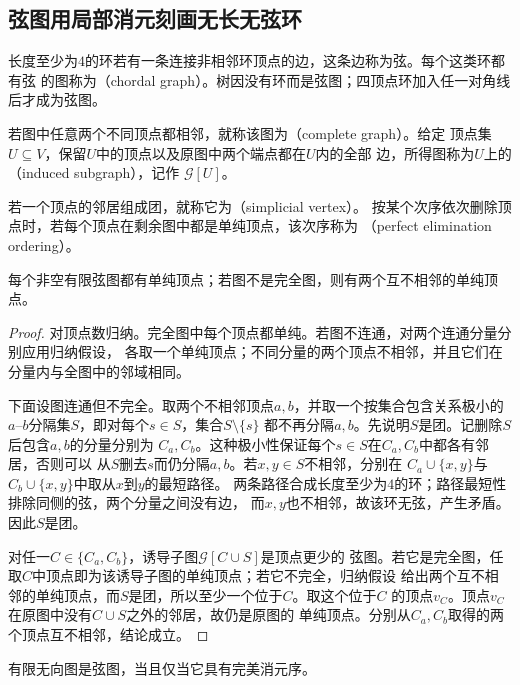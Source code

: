 \subsection{弦图用局部消元刻画无长无弦环}

长度至少为\(4\)的环若有一条连接非相邻环顶点的边，这条边称为弦。每个这类环都有弦
的图称为（chordal graph）。树因没有环而是弦图；四顶点环加入任一对角线
后才成为弦图。

若图中任意两个不同顶点都相邻，就称该图为（complete graph）。给定
顶点集\(U\subseteq V\)，保留\(U\)中的顶点以及原图中两个端点都在\(U\)内的全部
边，所得图称为\(U\)上的（induced subgraph），记作
\(\mathcal{G}[U]\)。

若一个顶点的邻居组成团，就称它为（simplicial vertex）。
按某个次序依次删除顶点时，若每个顶点在剩余图中都是单纯顶点，该次序称为
（perfect elimination ordering）。

\begin{lemma}[弦图的单纯顶点]
  \label{lem:graph-theory-chordal-simplicial-vertex}
  每个非空有限弦图都有单纯顶点；若图不是完全图，则有两个互不相邻的单纯顶点。
\end{lemma}

\begin{proof}
对顶点数归纳。完全图中每个顶点都单纯。若图不连通，对两个连通分量分别应用归纳假设，
各取一个单纯顶点；不同分量的两个顶点不相邻，并且它们在分量内与全图中的邻域相同。

下面设图连通但不完全。取两个不相邻顶点\(a,b\)，并取一个按集合包含关系极小的
\(a\)--\(b\)分隔集\(S\)，即对每个\(s\in S\)，集合\(S\setminus\{s\}\)
都不再分隔\(a,b\)。先说明\(S\)是团。记删除\(S\)后包含\(a,b\)的分量分别为
\(C_a,C_b\)。这种极小性保证每个\(s\in S\)在\(C_a,C_b\)中都各有邻居，否则可以
从\(S\)删去\(s\)而仍分隔\(a,b\)。若\(x,y\in S\)不相邻，分别在
\(C_a\cup\{x,y\}\)与\(C_b\cup\{x,y\}\)中取从\(x\)到\(y\)的最短路径。
两条路径合成长度至少为\(4\)的环；路径最短性排除同侧的弦，两个分量之间没有边，
而\(x,y\)也不相邻，故该环无弦，产生矛盾。因此\(S\)是团。

对任一\(C\in\{C_a,C_b\}\)，诱导子图\(\mathcal{G}[C\cup S]\)是顶点更少的
弦图。若它是完全图，任取\(C\)中顶点即为该诱导子图的单纯顶点；若它不完全，归纳假设
给出两个互不相邻的单纯顶点，而\(S\)是团，所以至少一个位于\(C\)。取这个位于\(C\)
的顶点\(v_C\)。顶点\(v_C\)在原图中没有\(C\cup S\)之外的邻居，故仍是原图的
单纯顶点。分别从\(C_a,C_b\)取得的两个顶点互不相邻，结论成立。
\end{proof}

\begin{theorem}[弦图与完美消元序]
  \label{thm:graph-theory-chordal-perfect-elimination}
  有限无向图是弦图，当且仅当它具有完美消元序。
\end{theorem}

